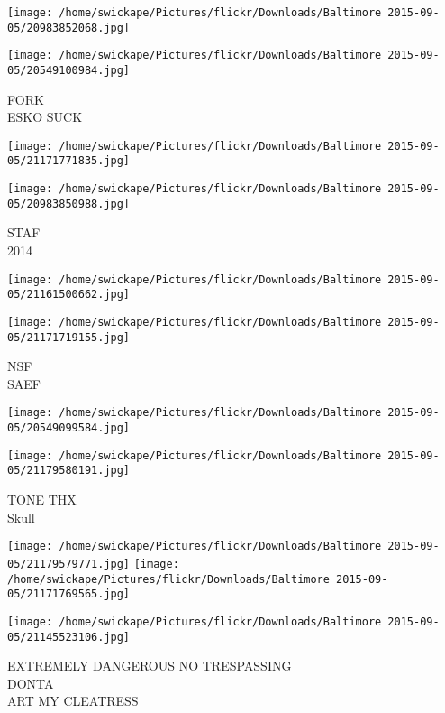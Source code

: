 \documentclass[10pt,letterpaper]{article}
\begin{document}
\texttt{[image: /home/swickape/Pictures/flickr/Downloads/Baltimore 2015-09-05/20983852068.jpg]}

\vspace{0.25in}
\texttt{[image: /home/swickape/Pictures/flickr/Downloads/Baltimore 2015-09-05/20549100984.jpg]}

FORK\\
ESKO SUCK\\
\pagebreak

\texttt{[image: /home/swickape/Pictures/flickr/Downloads/Baltimore 2015-09-05/21171771835.jpg]}

\vspace{0.25in}
\texttt{[image: /home/swickape/Pictures/flickr/Downloads/Baltimore 2015-09-05/20983850988.jpg]}

STAF\\
2014\\
\pagebreak

\texttt{[image: /home/swickape/Pictures/flickr/Downloads/Baltimore 2015-09-05/21161500662.jpg]}

\vspace{0.25in}
\texttt{[image: /home/swickape/Pictures/flickr/Downloads/Baltimore 2015-09-05/21171719155.jpg]}

NSF\\
SAEF\\
\pagebreak

\texttt{[image: /home/swickape/Pictures/flickr/Downloads/Baltimore 2015-09-05/20549099584.jpg]}

\vspace{0.25in}
\texttt{[image: /home/swickape/Pictures/flickr/Downloads/Baltimore 2015-09-05/21179580191.jpg]}

TONE THX\\
Skull\\
\pagebreak

\texttt{[image: /home/swickape/Pictures/flickr/Downloads/Baltimore 2015-09-05/21179579771.jpg]}
\texttt{[image: /home/swickape/Pictures/flickr/Downloads/Baltimore 2015-09-05/21171769565.jpg]}

\vspace{0.25in}
\texttt{[image: /home/swickape/Pictures/flickr/Downloads/Baltimore 2015-09-05/21145523106.jpg]}

EXTREMELY DANGEROUS NO TRESPASSING\\
DONTA\\
ART MY CLEATRESS\\
\pagebreak
\end{document}
